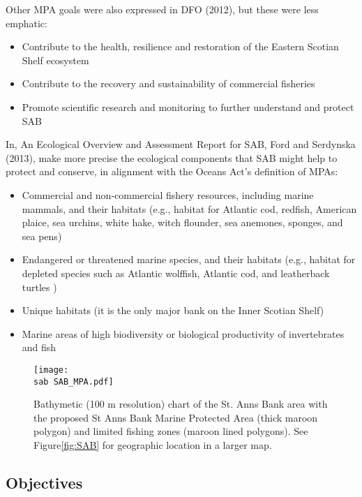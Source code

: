 \documentclass[letterpaper,portrait,11pt]{scrartcl}
\numberwithin{equation}{section}		%
\numberwithin{figure}{section}		%
\numberwithin{table}{section}				%
\newcommand{\ecomod}{\string~/ecomod_data/}   %
\newcommand{\sab}{\ecomod/mpa/sab/}   %
\newcommand{\analysis}{\ecomod/mpa/analysis/}   %
\begin{document}
Other MPA goals were also expressed in DFO (2012), but these were less emphatic:

\begin{itemize}
	\item Contribute to the health, resilience and restoration of the Eastern Scotian Shelf ecosystem
	\item Contribute to the recovery and sustainability of commercial fisheries 
	\item Promote scientific research and monitoring to further understand and protect SAB
\end{itemize}

In, An Ecological Overview and Assessment Report for SAB, Ford and Serdynska (2013), make more precise the ecological components that SAB might help to protect and conserve, in alignment with the Oceans Act's definition of MPAs:

\begin{itemize}
	\item Commercial and non-commercial fishery resources, including marine mammals, and their habitats (e.g., habitat for Atlantic cod, redfish, American plaice, sea urchins, white hake, witch flounder, sea anemones, sponges, and sea pens)
  \item Endangered or threatened marine species, and their habitats (e.g., habitat for depleted species such as Atlantic wolffish, Atlantic cod, and leatherback turtles )
  \item Unique habitats (it is the only major bank on the Inner Scotian Shelf)
  \item Marine areas of high biodiversity or biological productivity of invertebrates and fish
\end{itemize}

\begin{figure}[h]
  \label{fig:SABCloseup}
  \centering
  \texttt{[image: \\sab SAB\_MPA.pdf]}
  \caption{Bathymetic (100 m resolution) chart of the  St. Anns Bank area with the proposed St Anns Bank Marine Protected Area (thick maroon polygon) and limited fishing zones (maroon lined polygons). See Figure\ref{fig:SAB} for geographic location in a larger map.}
\end{figure}

\subsection{Objectives}
\end{document}
